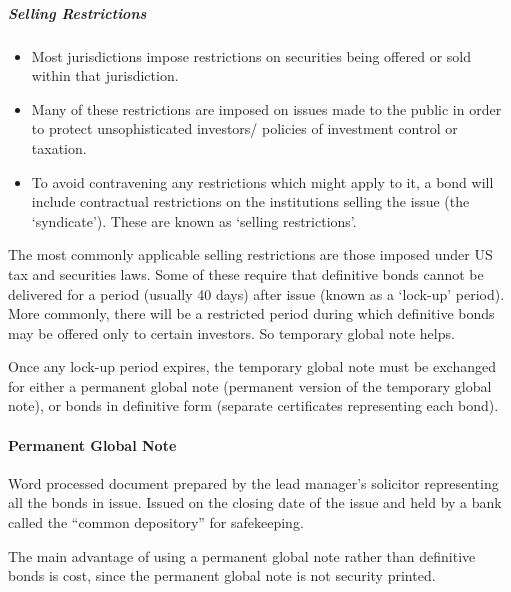 \documentclass[
]{article}
\newenvironment{Shaded}{}{}
\newcommand{\NormalTok}[1]{#1}
\providecommand{\tightlist}{%
  \setlength{\itemsep}{0pt}\setlength{\parskip}{0pt}}
\begin{document}
\hypertarget{selling-restrictions}{%
\subparagraph{Selling Restrictions}\label{selling-restrictions}}

\begin{itemize}
\tightlist
\item
  Most jurisdictions impose restrictions on securities being offered or
  sold within that jurisdiction.
\item
  Many of these restrictions are imposed on issues made to the public in
  order to protect unsophisticated investors/ policies of investment
  control or taxation.
\item
  To avoid contravening any restrictions which might apply to it, a bond
  will include contractual restrictions on the institutions selling the
  issue (the `syndicate'). These are known as `selling restrictions'.
\end{itemize}

\begin{Shaded}
\begin{Highlighting}[]
\NormalTok{The most commonly applicable selling restrictions are those imposed under US tax and securities laws. Some of these require that definitive bonds cannot be delivered for a period (usually 40 days) after issue (known as a ‘lock{-}up’ period). More commonly, there will be a restricted period during which definitive bonds may be offered only to certain investors. So temporary global note helps. }
\end{Highlighting}
\end{Shaded}

Once any lock-up period expires, the temporary global note must be
exchanged for either a permanent global note (permanent version of the
temporary global note), or bonds in definitive form (separate
certificates representing each bond).

\hypertarget{permanent-global-note}{%
\paragraph{Permanent Global Note}\label{permanent-global-note}}

Word processed document prepared by the lead manager's solicitor
representing all the bonds in issue. Issued on the closing date of the
issue and held by a bank called the ``common depository'' for
safekeeping.

The main advantage of using a permanent global note rather than
definitive bonds is cost, since the permanent global note is not
security printed.
\end{document}
